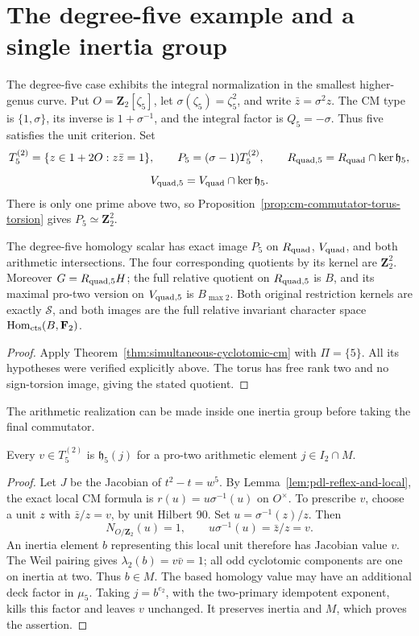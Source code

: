 \section{The degree-five example and a single inertia group}
\label{sec:genus-two-coefficient-two}
The degree-five case exhibits the integral normalization in the smallest
higher-genus curve. Put \(O=\mathbf Z_2[\zeta_5]\), let
\(\sigma(\zeta_5)=\zeta_5^2\), and write \(\bar z=\sigma^2z\).
The CM type is \(\{1,\sigma\}\), its inverse is
\(1+\sigma^{-1}\), and the integral factor is \(Q_5=-\sigma\).
Thus five satisfies the unit criterion. Set
\[
 T_5^{(2)}=\{z\in1+2O:z\bar z=1\},\qquad
 P_5=(\sigma-1)T_5^{(2)},\qquad
 R_{{\rm quad},5}=R_{\rm quad}\cap\ker\mathfrak h_5,
\]
\[
 V_{{\rm quad},5}=V_{\rm quad}\cap\ker\mathfrak h_5.
\]
There is only one prime above two, so
Proposition~\ref{prop:cm-commutator-torus-torsion} gives
\(P_5\simeq\mathbf Z_2^2\).

\begin{corollary}\label{thm:genus-two-exact-image}
The degree-five homology scalar has exact image \(P_5\) on
\(R_{\rm quad}\), \(V_{\rm quad}\), and both arithmetic intersections.
The four corresponding quotients by its kernel are \(\mathbf Z_2^2\).
Moreover \(G=R_{{\rm quad},5}H\); the full relative quotient on
\(R_{{\rm quad},5}\) is \(B\), and its maximal pro-two version on
\(V_{{\rm quad},5}\) is \(B_{\max2}\). Both original restriction
kernels are exactly \(\mathcal S\), and both images are the full
relative invariant character space \(\operatorname{Hom}_{\rm cts}(B,\mathbf F_2)\).
\end{corollary}
\begin{proof}
Apply Theorem~\ref{thm:simultaneous-cyclotomic-cm} with \(\Pi=\{5\}\).
All its hypotheses were verified explicitly above. The torus has free
rank two and no sign-torsion image, giving the stated quotient.
\end{proof}

The arithmetic realization can be made inside one inertia group before
taking the final commutator.
\begin{lemma}\label{lem:genus-two-inertia-M}
Every \(v\in T_5^{(2)}\) is \(\mathfrak h_5(j)\) for a pro-two
arithmetic element \(j\in I_2\cap M\).
\end{lemma}
\begin{proof}
Let \(J\) be the Jacobian of \(t^2-t=w^5\). By
Lemma~\ref{lem:pdl-reflex-and-local}, the exact local CM formula is
\(r(u)=u\sigma^{-1}(u)\) on \(O^\times\). To prescribe \(v\),
choose a unit \(z\) with \(\bar z/z=v\), by unit Hilbert 90.
Set \(u=\sigma^{-1}(z)/z\). Then
\[
 N_{O/\mathbf Z_2}(u)=1,\qquad
 u\sigma^{-1}(u)=\bar z/z=v.
\]
An inertia element \(b\) representing this local unit therefore has
Jacobian value \(v\). The Weil pairing gives
\(\lambda_2(b)=v\bar v=1\); all odd cyclotomic components are one
on inertia at two. Thus \(b\in M\). The based homology value may
have an additional deck factor in \(\mu_5\). Taking
\(j=b^{e_2}\), with the two-primary idempotent exponent, kills this
factor and leaves \(v\) unchanged. It preserves inertia and \(M\),
which proves the assertion.
\end{proof}

